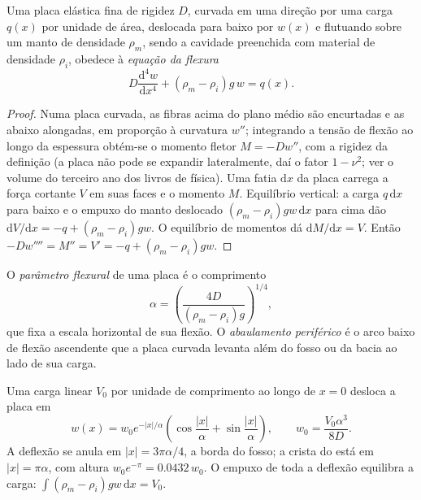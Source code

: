 \begin{theorem}\label{thm:b3:gravity-geodesy:plate}
Uma placa elástica fina de rigidez $D$, curvada em uma direção por uma carga $q(x)$
por unidade de área, deslocada para baixo por $w(x)$ e flutuando sobre um manto de densidade
$\rho_m$, sendo a cavidade preenchida com material de densidade $\rho_i$, obedece à
\emph{equação da flexura}
\[
  D\frac{\mathrm d^4w}{\mathrm dx^4} + (\rho_m - \rho_i)g\,w = q(x) .
\]
\end{theorem}

\begin{proof}
Numa placa curvada, as fibras acima do plano médio são encurtadas e as abaixo
alongadas, em proporção à curvatura $w''$; integrando a tensão de flexão
ao longo da espessura obtém-se o momento fletor $M = -Dw''$, com a
rigidez da definição (a placa não pode se expandir lateralmente, daí o fator
$1 - \nu^2$; ver o volume do terceiro ano dos livros de física). Uma fatia $\mathrm dx$ da placa
carrega a força cortante $V$ em suas faces e o momento $M$. Equilíbrio vertical:
a carga $q\,\mathrm dx$ para baixo e o empuxo do manto deslocado
$(\rho_m - \rho_i)gw\,\mathrm dx$ para cima dão $\mathrm dV/\mathrm dx = -q +
(\rho_m - \rho_i)gw$. O equilíbrio de momentos dá $\mathrm dM/\mathrm dx = V$.
Então $-Dw'''' = M'' = V' = -q + (\rho_m - \rho_i)gw$.
\end{proof}

\begin{definition}\label{def:b3:gravity-geodesy:alpha}
O \emph{parâmetro flexural} de uma placa é o
comprimento
\[
  \alpha = \left(\frac{4D}{(\rho_m - \rho_i)g}\right)^{1/4},
\]
que fixa a escala horizontal de sua flexão. O \emph{abaulamento periférico}
é o arco baixo de flexão ascendente que a placa curvada levanta além do fosso ou da
bacia ao lado de sua carga.
\end{definition}

\begin{proposition}\label{prop:b3:gravity-geodesy:line}
Uma carga linear $V_0$ por unidade de comprimento ao longo de $x = 0$ desloca a placa em
\[
  w(x) = w_0e^{-|x|/\alpha}\left(\cos\frac{|x|}{\alpha} + \sin\frac{|x|}{\alpha}\right),
  \qquad w_0 = \frac{V_0\alpha^3}{8D} .
\]
A deflexão se anula em $|x| = 3\pi\alpha/4$, a borda do fosso; a
crista do  está em $|x| = \pi\alpha$, com altura $w_0e^{-\pi} =
\num{0.0432}\,w_0$. O empuxo de toda a deflexão equilibra a carga:
$\int(\rho_m - \rho_i)gw\,\mathrm dx = V_0$.
\end{proposition}

